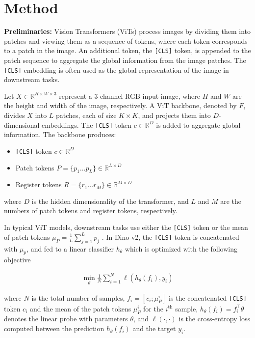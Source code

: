 \documentclass[conference]{IEEEtran}
\begin{document}
%
 \section{Method}





\noindent\textbf{Preliminaries:}
Vision Transformers (ViTs) process images by dividing them into patches and viewing them as a sequence of tokens, where each token corresponds to a patch in the image. An additional token, the \texttt{[CLS]} token, is appended to the patch sequence to aggregate the global information from the image patches. The \texttt{[CLS]} embedding is often used as the global representation of the image in downstream tasks. 

Let $X \in \mathbb{R}^{H \times W \times 3}$ represent a $3$ channel RGB input image, where $H$ and $W$ are the height and width of the image, respectively. A ViT backbone, denoted by $F$, divides $X$ into $L$ patches, each of size $K \times K$, and projects them into $D$-dimensional embeddings. The \texttt{[CLS]} token $c \in \mathbb{R}^D$ is added to aggregate global information. The backbone produces:  

\begin{itemize}
    \item \texttt{[CLS]} token $c \in \mathbb{R}^D$
    \item Patch tokens $P = \{p_1 \ldots p_L \} \in \mathbb{R}^{L \times D} $
    \item Register tokens $R = \{r_1 \ldots r_M \} \in \mathbb{R}^{M \times D}$
\end{itemize}

where $D$ is the hidden dimensionality of the transformer, and $L$ and $M$ are the numbers of patch tokens and register tokens, respectively. 

In typical ViT models, downstream tasks use either the \texttt{[CLS]} token or the mean of patch tokens $\mu_P = \frac{1}{L} \sum_{j=1}^L p_j$ \cite{Zhai_2022_CVPR,li2024inverse}. In Dino-v2, the \texttt{[CLS]} token is concatenated with $\mu_p$, and fed to a linear classifier $h_{\theta}$ which is optimized with the following objective 

\begin{align}
\min_{\theta} \frac{1}{N} \sum_{i=1}^{N} \ell(h_{\theta}(f_i), y_i)
\label{eq:ERM}
\end{align}

where $N$ is the total number of samples, $f_i = [c_i; \mu_P^i]$ is the concatenated  \texttt{[CLS]} token \( c_i \) and the mean of the patch tokens \( \mu_P^i \) for the \(i^\text{th}\) sample, $h_{\theta}(f_i) = f_i^\top \theta$ denotes the linear probe with parameters \( \theta \), and \( \ell(\cdot, \cdot) \) is the cross-entropy loss computed between the prediction \( h_{\theta}(f_i) \) and the target \( y_i \). \\
\end{document}
